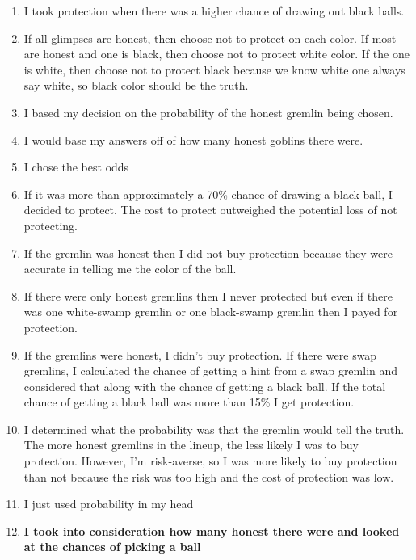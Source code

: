 \documentclass[12pt,a4paper]{article}
\begin{document}
\begin{appendices}
\begin{enumerate}
\item I took protection when there was a higher chance of drawing out black balls.

\item If all glimpses are honest, then choose not to protect on each color. If most are honest and one is black, then choose not to protect white color. If the one is white, then choose not to protect black because we know white one always say white, so black color should be the truth.

\item I based my decision on the probability of the honest gremlin being chosen.

\item I would base my answers off of how many honest goblins there were.

\item I chose the best odds

\item If it was more than approximately a 70\% chance of drawing a black ball, I decided to protect. The cost to protect outweighed the potential loss of not protecting.

\item If the gremlin was honest then I did not buy protection because they were accurate in telling me the color of the ball.

\item If there were only honest gremlins then I never protected but even if there was one white-swamp gremlin or one black-swamp gremlin then I payed for protection.

\item If the gremlins were honest, I didn't buy protection. If there were swap gremlins, I calculated the chance of getting a hint from a swap gremlin and considered that along with the chance of getting a black ball. If the total chance of getting a black ball was more than 15\% I get protection.

\item I determined what the probability was that the gremlin would tell the truth. The more honest gremlins in the lineup, the less likely I was to buy protection. However, I'm risk-averse, so I was more likely to buy protection than not because the risk was too high and the cost of protection was low.

\item I just used probability in my head

\item \textbf{I took into consideration how many honest there were and looked at the chances of picking a ball}


\end{enumerate}
\end{appendices}
\end{document}
